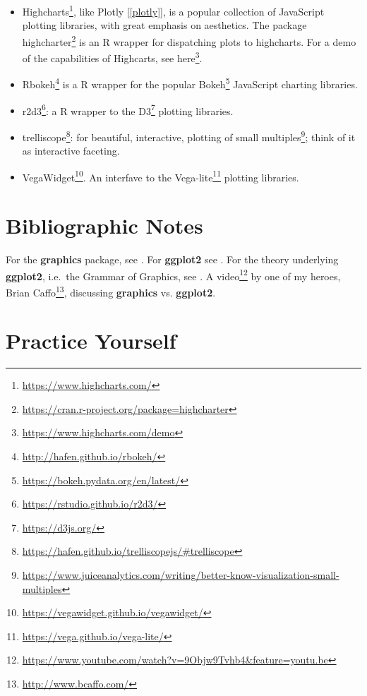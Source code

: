 \documentclass[]{book}
\renewcommand{\href}[2]{#2\footnote{\url{#1}}}
\theoremstyle{definition}
\theoremstyle{definition}
\theoremstyle{definition}
\theoremstyle{remark}
\begin{document}
\begin{itemize}
\item
  \href{https://www.highcharts.com/}{Highcharts}, like Plotly {[}\ref{plotly}{]}, is a popular collection of JavaScript plotting libraries, with great emphasis on aesthetics.
  The package \href{https://cran.r-project.org/package=highcharter}{highcharter} is an R wrapper for dispatching plots to highcharts.
  For a demo of the capabilities of Highcarts, see \href{https://www.highcharts.com/demo}{here}.
\item
  \href{http://hafen.github.io/rbokeh/}{Rbokeh} is a R wrapper for the popular \href{https://bokeh.pydata.org/en/latest/}{Bokeh} JavaScript charting libraries.
\item
  \href{https://rstudio.github.io/r2d3/}{r2d3}: a R wrapper to the \href{https://d3js.org/}{D3} plotting libraries.
\item
  \href{https://hafen.github.io/trelliscopejs/\#trelliscope}{trelliscope}: for beautiful, interactive, plotting of \href{https://www.juiceanalytics.com/writing/better-know-visualization-small-multiples}{small multiples}; think of it as interactive faceting.
\item
  \href{https://vegawidget.github.io/vegawidget/}{VegaWidget}. An interfave to the \href{https://vega.github.io/vega-lite/}{Vega-lite} plotting libraries.
\end{itemize}

\hypertarget{bibliographic-notes-10}{%
\section{Bibliographic Notes}\label{bibliographic-notes-10}}

For the \textbf{graphics} package, see \citet{Rlanguage}.
For \textbf{ggplot2} see \citet{ggplot2}.
For the theory underlying \textbf{ggplot2}, i.e.~the Grammar of Graphics, see \citet{wilkinson2006grammar}.
A \href{https://www.youtube.com/watch?v=9Objw9Tvhb4\&feature=youtu.be}{video} by one of my heroes, \href{http://www.bcaffo.com/}{Brian Caffo}, discussing \textbf{graphics} vs. \textbf{ggplot2}.

\hypertarget{practice-yourself-8}{%
\section{Practice Yourself}\label{practice-yourself-8}}
\end{document}
